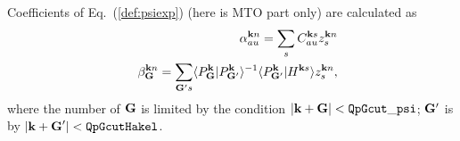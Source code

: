 \documentclass[a4paper,10pt,fleqn]{article}
\newcommand{\req}[1]{\mbox{Eq.~(\ref{#1})}}
\begin{document}
Coefficients of \req{def:psiexp} (here is MTO part only)
are calculated as
\begin{eqnarray}
&&\alpha^{{\bf k} n}_{au} = \sum_s C^{{\bf k}s}_{a u} z^{{\bf k}n}_s \\
&&\beta^{{\bf k}n}_{\bf G} = \sum_{{\bf G}'s} 
\langle P^{\bf k}_{\bf G}|P^{\bf k}_{{\bf G}'}\rangle^{-1}
\langle P^{\bf k}_{{\bf G}'}|H^{{\bf k}s}\rangle z^{{\bf k}n}_s,
\end{eqnarray}
where the number of ${\bf G}$ is limited by the condition
$|{\bf k+G}|< {\tt QpGcut\_psi}$;
${\bf G}'$ is by $|{\bf k+G}'|< {\tt  QpGcutHakel}$.



	

	



\end{document}
